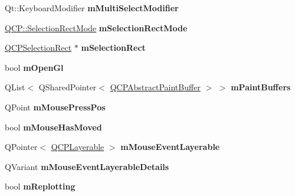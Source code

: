 \begin{DoxyCompactItemize}
\item 
\mbox{\label{class_q_custom_plot_a0e97e701c5671e7e463d2ce0211d0f8a}} 
Qt\+::\+Keyboard\+Modifier {\bfseries m\+Multi\+Select\+Modifier}
\item 
\mbox{\label{class_q_custom_plot_abe04c5def373cc4fede8de20542ca3f2}} 
\hyperlink{namespace_q_c_p_ac9aa4d6d81ac76b094f9af9ad2d3aacf}{Q\+C\+P\+::\+Selection\+Rect\+Mode} {\bfseries m\+Selection\+Rect\+Mode}
\item 
\mbox{\label{class_q_custom_plot_a4827bc84ef5ce52dfbf9ff630ed1b276}} 
\hyperlink{class_q_c_p_selection_rect}{Q\+C\+P\+Selection\+Rect} $\ast$ {\bfseries m\+Selection\+Rect}
\item 
\mbox{\label{class_q_custom_plot_a0841dbea13bd120d20e3f0cc36767ff9}} 
bool {\bfseries m\+Open\+Gl}
\item 
\mbox{\label{class_q_custom_plot_a57b270b1e3990e0d1b9fb39b137d5a5d}} 
Q\+List$<$ Q\+Shared\+Pointer$<$ \hyperlink{class_q_c_p_abstract_paint_buffer}{Q\+C\+P\+Abstract\+Paint\+Buffer} $>$ $>$ {\bfseries m\+Paint\+Buffers}
\item 
\mbox{\label{class_q_custom_plot_ac57090da95056ae4dd67be67adfa85bd}} 
Q\+Point {\bfseries m\+Mouse\+Press\+Pos}
\item 
\mbox{\label{class_q_custom_plot_ad2108936f001a8be5974b0b6ff13dae3}} 
bool {\bfseries m\+Mouse\+Has\+Moved}
\item 
\mbox{\label{class_q_custom_plot_a243867f445d2f4e35e00add2f589e1da}} 
Q\+Pointer$<$ \hyperlink{class_q_c_p_layerable}{Q\+C\+P\+Layerable} $>$ {\bfseries m\+Mouse\+Event\+Layerable}
\item 
\mbox{\label{class_q_custom_plot_ad604958ef16fc022c474521a08d88a2d}} 
Q\+Variant {\bfseries m\+Mouse\+Event\+Layerable\+Details}
\item 
\mbox{\label{class_q_custom_plot_ab30daeca6612c3948afd368dce5f1c39}} 
bool {\bfseries m\+Replotting}

\end{DoxyCompactItemize}
